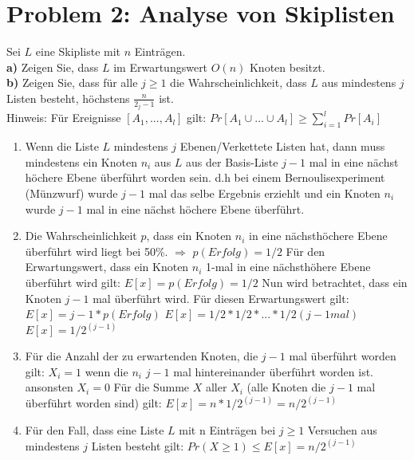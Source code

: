 \section*{{Problem 2: Analyse von Skiplisten}} 

Sei $L$ eine Skipliste mit $n$ Einträgen.\\

\textbf{a)} Zeigen Sie, dass $L$ im Erwartungswert $O(n)$ Knoten besitzt.\\



\textbf{b)} Zeigen Sie, dass für alle $j \geq 1$ die Wahrscheinlichkeit, dass $L$ aus mindestens $j$ Listen besteht, höchstens $\frac{n}{2_j-1}$ ist.\\
Hinweis: Für Ereignisse $[A_1,..., A_l]$ gilt: $Pr[A_{1} \cup ... \cup A_{l}] \geq \sum_{i=1}^{l}Pr[A_i]$\\
 
\begin{enumerate}
\item Wenn die Liste $L$ mindestens $j$ Ebenen/Verkettete Listen hat, dann muss mindestens ein Knoten $n_i$ aus $L$ aus der Basis-Liste $j-1$ mal in eine nächst höchere Ebene überführt worden sein.
   d.h bei einem Bernoulisexperiment (Münzwurf) wurde $j-1$ mal das selbe Ergebnis erziehlt und ein Knoten $n_i$ wurde $j-1$ mal in eine nächst höchere Ebene überführt.
\item Die Wahrscheinlichkeit $p$, dass ein Knoten $n_i$ in eine nächsthöchere Ebene überführt wird liegt bei 50\%. $\Rightarrow$ $p(Erfolg) = 1/2$
   Für den Erwartungswert, dass ein Knoten $n_i$ 1-mal in eine nächsthöhere Ebene überführt wird gilt: $E[x] = p(Erfolg) = 1/2$
   Nun wird betrachtet, dass ein Knoten $j-1$ mal überführt wird. Für diesen Erwartungswert gilt: $E[x] = j-1*p(Erfolg)$
   $E[x] = 1/2 * 1/2 * ... * 1/2 (j-1 mal)$
   $E[x] = 1/2^(j-1)$
\item Für die Anzahl der zu erwartenden Knoten, die $j-1$ mal überführt worden gilt:
   $X_i = 1$ wenn die $n_i$ $j-1$ mal hintereinander überführt worden ist. ansonsten $X_i = 0$
   Für die Summe $X$ aller $X_i$ (alle Knoten die $j-1$ mal überführt worden sind) gilt: $E[x] = n*1/2^(j-1) = n/2^(j-1)$
\item Für den Fall, dass eine Liste $L$ mit n Einträgen bei $j \geq 1$ Versuchen aus mindestens $j$ Listen besteht gilt: 
   $Pr(X \geq 1) \leq E[x] = n/2^(j-1)$
\end{enumerate}







